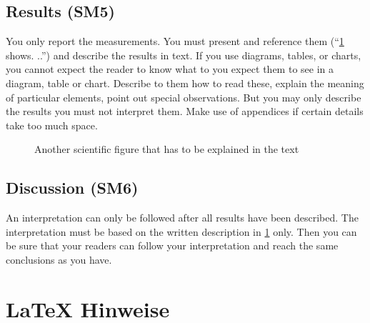 \documentclass[
  fontsize=10pt,
  numbers=noenddot,
  english,  %
  paper=a5,
  twoside,  %
  DIV=calc,
  headings=small,
  bibliography=totoc,
  listof=totoc,
  draft=false
]{scrbook}
\theoremstyle{break}
\begin{document}
\section{Results (SM5)}\label{sec:evaluation:results}

You only report the measurements.
You must present and reference them (``\cref{fig:my_label2} shows.
..'') and describe the results in text.
If you use diagrams, tables, or charts, you cannot expect the reader to know what to you expect them to see in a diagram, table or chart.
Describe to them how to read these, explain the meaning of particular elements, point out special observations.
But you may only describe the results you must not interpret them.
Make use of appendices if certain details take too much space.

\begin{figure}
  \centering
  \caption{Another scientific figure that has to be explained in the text}
  \label{fig:my_label2}
\end{figure}

\section{Discussion (SM6)}\label{sec:evaluation:discussion}

An interpretation can only be followed after all results have been described.
The interpretation must be based on the written description in \cref{sec:evaluation:results} only.
Then you can be sure that your readers can follow your interpretation and reach the same conclusions as you have.


\chapter{LaTeX Hinweise}
\label{sec:latexhints}

\newcount\LTGbeginlineexample
\newcount\LTGendlineexample
\newenvironment{ltgexample}%
{\LTGbeginlineexample=\numexpr\inputlineno+1\relax}%
{\LTGendlineexample=\numexpr\inputlineno-1\relax%
  \tcbinputlisting{%
    listing only,
    listing file=\currfilepath,
    colback=green!5!white,
    colframe=green!25,
    coltitle=black!90,
    coltext=black!90,
    left=8mm,
    title=Zugehöriger \LaTeX{}-Quelltext aus \texttt{\currfilepath},
    listing options={
        frame=none,
        language={[LaTeX]TeX},
        escapeinside={},
        firstline=\the\LTGbeginlineexample,
        lastline=\the\LTGendlineexample,
        firstnumber=\the\LTGbeginlineexample,
        basewidth=.5em,
        aboveskip=0mm,
        belowskip=0mm,
        numbers=left,
        xleftmargin=0mm,
        numberstyle=\tiny,
        numbersep=8pt%
      }
  }
}%
\end{document}
